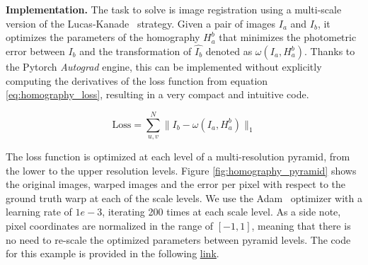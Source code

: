 \textbf{Implementation.} The task to solve is image registration using a multi-scale version of the Lucas-Kanade~\citep{BaM2004} strategy. Given a pair of images $I_a$ and $I_b$, it optimizes the parameters of the homography $H_a^b$ that minimizes the photometric error between $I_b$ and the transformation of $\hat{I_b}$ denoted as $\omega(I_a, H_a^b)$. Thanks to the Pytorch \textit{Autograd} engine, this can be implemented without explicitly computing the derivatives of the loss function from equation \ref{eq:homography_loss}, resulting in a very compact and intuitive code.

\begin{equation}
\text{Loss} = \sum_{u,v}^{N} \| I_b - \omega(I_a, H_a^b) \|_1
\label{eq:homography_loss}
\end{equation}

The loss function is optimized at each level of a multi-resolution pyramid, from the lower to the upper resolution levels. Figure \ref{fig:homography_pyramid} shows the original images, warped images and the error per pixel with respect to the ground truth warp at each of the scale levels. We use the Adam~\citep{adam2015} optimizer with a learning rate of $1e-3$, iterating 200 times at each scale level. As a side note, pixel coordinates are normalized in the range of $[-1, 1]$, meaning that there is no need to re-scale the optimized parameters between pyramid levels. The code for this example is provided in the following \underline{\color{blue}\href{https://github.com/kornia/kornia-examples/blob/master/homography.ipynb}{link}}.


